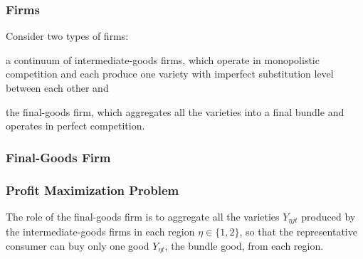 \documentclass[../thesis.tex]{subfiles}
\begin{document}
\begin{comment}

Define the regional consumer inflation gross rate:
\begin{align}
	\pi_{\eta t} &= \frac{Q_{\eta t}}{Q_{\eta, t-1}} \label{eq_v6:consumer-inflation}
\end{align}

The relation between the nominal $R_{t}$ and the real $r_{t}$ interest rates is the gross inflation rate $\pi_{t}$, given by the Fisher equation. %
\begin{align}
	\pi_{t} = \frac{(1 + R_{t})}{(1 + r_{t})}  \label{eq_v6:fisher-equation}
\end{align}
	
\end{comment}


\subsubsection*{Firms}

Consider two types of firms: 
\begin{enumerate*}[label=(\arabic*)]
	\item a continuum of intermediate-goods firms, which operate in monopolistic competition and each produce one variety with imperfect substitution level between each other and
	
	\item the final-goods firm, which aggregates all the varieties into a final bundle and operates in perfect competition.
\end{enumerate*}


\subsubsection{Final-Goods Firm}

\subsubsection*{Profit Maximization Problem}

The role of the final-goods firm is to aggregate all the varieties $Y_{\eta jt}$ produced by the intermediate-goods firms in each region $\eta \in \{1,2\}$, so that the representative consumer can buy only one good $Y_{\eta t}$, the bundle good, from each region.
\end{document}
